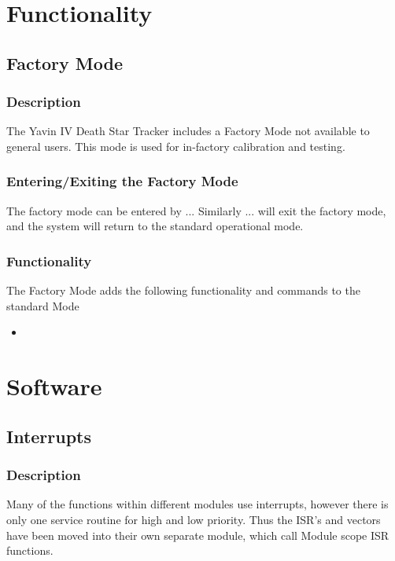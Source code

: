 \documentclass[]{report}
\begin{document}
\part{Functionality}
\chapter{Factory Mode}
\section{Description}
The Yavin IV Death Star Tracker includes a Factory Mode not available to general users. This mode is used for in-factory calibration and testing.

\section{Entering/Exiting the Factory Mode}
The factory mode can be entered by ... Similarly ... will exit the factory mode, and the system will return to the standard operational mode.

\section{Functionality}
The Factory Mode adds the following functionality and commands to the standard Mode
\begin{itemize}
	\item
\end{itemize}


\part{Software}

\chapter{Interrupts}
\section{Description}
Many of the functions within different modules use interrupts, however there is only one service routine for high and low priority. Thus the ISR's and vectors have been moved into their own separate module, which call Module scope ISR functions.
\end{document}
